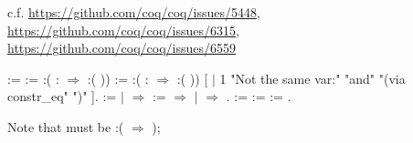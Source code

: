  c.f. \url{https://github.com/coq/coq/issues/5448},
         \url{https://github.com/coq/coq/issues/6315},
         \url{https://github.com/coq/coq/issues/6559} \begin{coqdoccode}
\coqdocemptyline
\coqdocnoindent
{}    :=\coqdoceol
\coqdocindent{1.00em}
  := :(   :  \ensuremath{\Rightarrow} :( )) \coqdoceol
\coqdocindent{1.00em}
  := :(   :  \ensuremath{\Rightarrow} :( )) \coqdoceol
\coqdocindent{1.00em}
 [   \coqdoceol
\coqdocindent{4.00em}
\ensuremath{|}  1 "Not the same var:"  "and"  "(via constr\_eq"   ")" ].\coqdoceol
\coqdocnoindent
{}    :=\coqdoceol
\coqdocindent{1.00em}
  \coqdoceol
\coqdocindent{1.00em}
\ensuremath{|} \coqdocvar{\_} \ensuremath{\Rightarrow}  \coqdocvar{\_\_} :=    \coqdocvar{\_} \ensuremath{\Rightarrow}     \coqdoceol
\coqdocindent{4.50em}
\coqdoceol
\coqdocindent{1.00em}
\ensuremath{|} \coqdocvar{\_} \ensuremath{\Rightarrow} \coqdoceol
\coqdocindent{1.00em}
.\coqdoceol
\coqdocnoindent
{}   :=\coqdoceol
\coqdocindent{1.00em}
  :=   \coqdoceol
\coqdocindent{1.00em}
  :=   \coqdoceol
\coqdocindent{1.00em}
  .\coqdoceol
\coqdocemptyline
\end{coqdoccode}
Note that  must be :(  \ensuremath{\Rightarrow}  );
